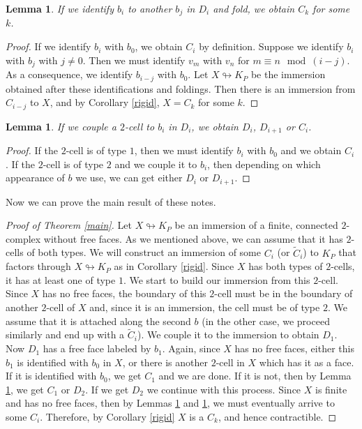 \documentclass{amsart}
\theoremstyle{plain}
\newtheorem{lem}[thm]{Lemma}
\theoremstyle{definition}
\theoremstyle{remark}
\numberwithin{equation}{section}
\begin{document}
\begin{lem}\label{bibj}
If we identify $b_i$ to another $b_j$ in $D_i$ and fold, we obtain $C_k$ for some $k$. %
\end{lem}
\begin{proof}
If we identify $b_i$ with $b_0$, we obtain  $C_i$ by definition.
Suppose we identify $b_i$ with $b_j$ with $j\neq 0$.
Then we must identify $v_m$ with $v_n$ for $m\equiv n  \mod (i-j)$.
As a consequence, we identify $b_{i-j}$ with $b_0$.  Let $X \looparrowright K_P$ be the immersion obtained after these identifications and foldings. Then there is an immersion from $C_{i-j}$ to $X$, and by Corollary \ref{rigid}, $X=C_k$ for some $k$.
\end{proof}

\begin{lem}\label{iiD}
If we couple a $2$-cell to $b_i$ in $D_i$, we obtain $D_i$, $D_{i+1}$ or $C_i$.
\end{lem}
\begin{proof}
If the $2$-cell is of type $1$, then we must identify $b_i$ with $b_0$ and we obtain $C_i$.
If the $2$-cell is of type $2$ and we couple it to $b_i$, then depending on which appearance  of $b$ we use, we can get either $D_i$ or $D_{i+1}$.
\end{proof}

Now we can prove the main result of these notes.

\begin{proof}[Proof of Theorem \ref{main}]
Let $X\looparrowright K_P$ be an immersion of a finite, connected $2$-complex without free faces. As we mentioned above, we can assume that it has $2$-cells of both types.
We will construct an immersion of some $C_i$ (or $\tilde{C}_i$)  to $K_P$ that factors through  $X\looparrowright K_P$ as in Corollary \ref{rigid}.
Since $X$ has both types of $2$-cells, it has at least one of type $1$.
We start to build our immersion from this $2$-cell.
Since $X$ has no free faces, the boundary of this $2$-cell must be in the boundary of another $2$-cell of $X$ and, since it is an immersion, the cell must be of type $2$.
We assume that it is attached along the second $b$ (in the other case, we proceed similarly and end up with a $\tilde{C}_i$).
We couple it to the immersion to obtain $D_1$.
Now $D_1$ has a free face labeled by $b_1$. 
Again, since $X$ has no free faces, either this $b_1$ is identified with $b_0$ in $X$, or there is another $2$-cell in $X$ which has it as a face.
If it is identified with $b_0$, we get $C_1$ and we are done.
If it is not, then by Lemma \ref{iiD}, we get $C_1$ or $D_2$.
If we get $D_2$ we continue with this process. Since $X$ is finite and has no free faces, then by Lemmas \ref{bibj} and \ref{iiD}, we must eventually arrive to some $C_i$.
Therefore, by Corollary \ref{rigid} $X$ is a $C_k$, and hence contractible.
\end{proof}
\end{document}
